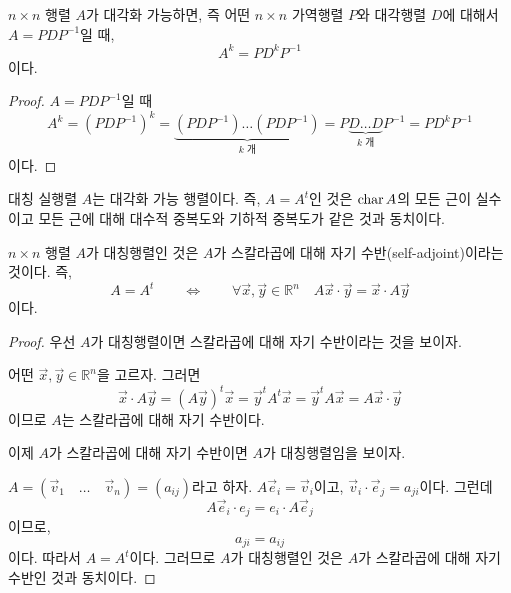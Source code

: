 \documentclass[../engineering_mathematics_lecture_note.tex]{subfiles}
\begin{document}
\begin{theorem}
    $n \times n$ 행렬 $A$가 대각화 가능하면, 즉 어떤 $n \times n$ 가역행렬 $P$와 대각행렬 $D$에 대해서 $A = PDP^{-1}$일 때,
    \begin{equation*}
        A^k = PD^k P^{-1}
    \end{equation*}
    이다.
\end{theorem}

\begin{proof}
    $A = PDP^{-1}$일 때
    \begin{equation*}
        A^k = (PDP^{-1})^k = \underbrace{(PDP^{-1}) \dots (PDP^{-1})}_\text{$k$ 개} = P\underbrace{D\dots D}_\text{$k$ 개}P^{-1} = PD^kP^{-1}
    \end{equation*}
    이다.
\end{proof}

\begin{theorem}
    대칭 실행렬 $A$는 대각화 가능 행렬이다.
    즉, $A = A^t$인 것은 $\operatorname{char} A$의 모든 근이 실수이고 모든 근에 대해 대수적 중복도와 기하적 중복도가 같은 것과 동치이다.
\end{theorem}

\begin{lemma} \label{lem:self_adjoint_sym}
    $n \times n$ 행렬 $A$가 대칭행렬인 것은 $A$가 스칼라곱에 대해 자기 수반(self-adjoint)이라는 것이다.
    즉,
    \begin{equation*}
        A = A^t \qquad \Longleftrightarrow \qquad \forall \vec x, \vec y \in \mathbb R^n \quad A\vec x \cdot \vec y = \vec x \cdot A \vec y
    \end{equation*}
    이다.
\end{lemma}

\begin{proof}
    우선 $A$가 대칭행렬이면 스칼라곱에 대해 자기 수반이라는 것을 보이자.

    어떤 $\vec x, \vec y \in \mathbb R^n$을 고르자.
    그러면
    \begin{equation*}
        \vec x \cdot A \vec y = (A\vec y)^t \vec x = \vec y^t A^t \vec x = \vec y^t A \vec x = A \vec x \cdot \vec y
    \end{equation*}
    이므로 $A$는 스칼라곱에 대해 자기 수반이다.

    이제 $A$가 스칼라곱에 대해 자기 수반이면 $A$가 대칭행렬임을 보이자.

    $A = (\vec v_1 \quad \dots \quad \vec v_n) = (a_{ij})$라고 하자.
    $A \vec e_i = \vec v_i$이고, $\vec v_i \cdot \vec e_j = a_{ji}$이다.
    그런데
    \begin{equation*}
        A \vec e_i \cdot e_j = e_i \cdot A \vec e_j
    \end{equation*}
    이므로,
    \begin{equation*}
        a_{ji} = a_{ij}
    \end{equation*}
    이다.
    따라서 $A = A^t$이다.
    그러므로 $A$가 대칭행렬인 것은 $A$가 스칼라곱에 대해 자기 수반인 것과 동치이다.
\end{proof}
\end{document}
